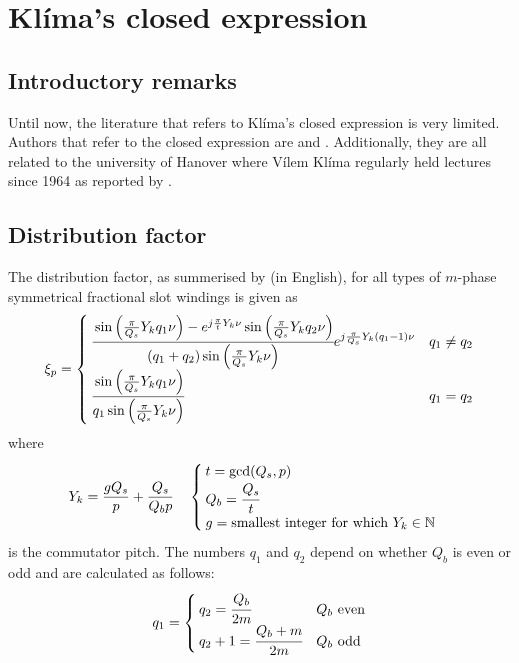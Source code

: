 \chapter{Kl\'ima's closed expression}\label{app:klima}
\section{Introductory remarks}
Until now, the literature that refers to Kl\'ima's closed expression is very limited. Authors that refer to the closed expression are \cite{Kremser1989} and \cite{brune_2003}. Additionally, they are all related to the university of Hanover where V\'ilem Kl\'ima regularly held lectures since 1964 as reported by \cite{Frohne1985}.  

\section{Distribution factor}
The distribution factor, as summerised by \cite{brune_2003} (in English), for all types of $m$-phase symmetrical fractional slot windings is given as
\begin{equation}
  \xi_{p}=
  \begin{cases}
  \cfrac
  {
   \sin\left(\frac{\pi}{Q_s}Y_kq_1\nu \right)-
   e^{j\frac{\pi}{t}Y_k \nu}
   \sin\left(\frac{\pi}{Q_s} Y_kq_2\nu\right)
  }
  {
   \left(q_1+q_2\right)
   \sin\left(\frac{\pi}{Q_s} Y_k\nu\right)
  }
  e^{j\frac{\pi}{Q_s}Y_k \left(q_1-1\right)\nu}
  &
  q_1\neq q_2\\
  \cfrac
  {
   \sin\left(\frac{\pi}{Q_s}Y_kq_1\nu \right)
  }
  {
   q_1 \sin\left(\frac{\pi}{Q_s} Y_k\nu\right)
  }
  &
  q_1= q_2\\  
  \end{cases}
\end{equation}
where 
\begin{equation}
  Y_k=\frac{gQ_s}{p}+\frac{Q_s}{Q_bp}
  \quad
  \begin{cases}
  t = \mbox{gcd}(Q_s,p)\\
  Q_b = \cfrac{Q_s}{t}\\
  g=\mbox{smallest integer for which}\ Y_k \in \mathbb{N}\\
  \end{cases}
\end{equation}
is the commutator pitch. The numbers $q_1$ and $q_2$ depend on whether $Q_b$ is even or odd and are calculated as follows:
\begin{equation}
  q_1=
  \begin{cases}
  q_2 = \cfrac{Q_b}{2m} & Q_b\ \mbox{even} \\
  q_2+1 = \cfrac{Q_b+m}{2m} & Q_b\ \mbox{odd}\\
  \end{cases}
\end{equation}